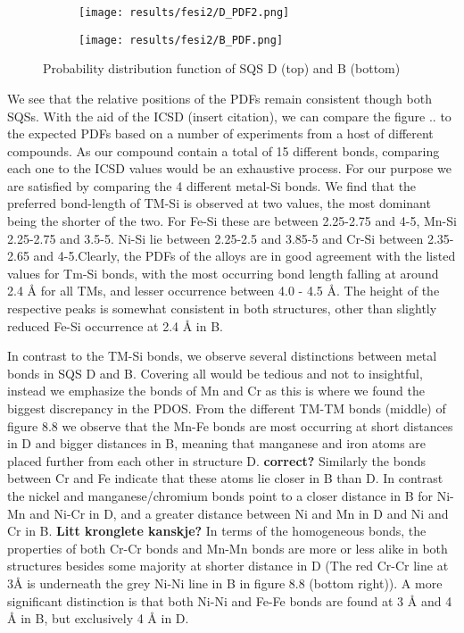 \begin{figure}[H]
	\centering
	\begin{subfigure}{\textwidth}
		\texttt{[image: results/fesi2/D\_PDF2.png]}
	\end{subfigure}
	\begin{subfigure}{\textwidth}
		\texttt{[image: results/fesi2/B\_PDF.png]}
	\end{subfigure}
	\caption{Probability distribution function of SQS D (top) and B (bottom)}
\end{figure}

We see that the relative positions of the PDFs remain consistent though both SQSs. With the aid of the ICSD (insert citation), we can compare the figure .. to the expected PDFs based on a number of experiments from a host of different compounds. As our compound contain a total of 15 different bonds, comparing each one to the ICSD values would be an exhaustive process. For our purpose we are satisfied by comparing the 4 different metal-Si bonds. We find that the preferred bond-length of TM-Si is observed at two values, the most dominant being the shorter of the two. For Fe-Si these are between 2.25-2.75 and 4-5, Mn-Si 2.25-2.75 and 3.5-5. Ni-Si lie between 2.25-2.5 and 3.85-5 and Cr-Si between 2.35-2.65 and 4-5.Clearly, the PDFs of the alloys are in good agreement with the listed values for Tm-Si bonds, with the most occurring bond length falling at around 2.4 Å for all TMs, and lesser occurrence between 4.0 - 4.5 Å. The height of the respective peaks is somewhat consistent in both structures, other than slightly reduced Fe-Si occurrence at 2.4 Å in B.

In contrast to the TM-Si bonds, we observe several distinctions between metal bonds in SQS D and B. Covering all would be tedious and not to insightful, instead we emphasize the bonds of Mn and Cr as this is where we found the biggest discrepancy in the PDOS. From the different TM-TM bonds (middle) of figure 8.8 we observe that the Mn-Fe bonds are most occurring at short distances in D and bigger distances in B, meaning that manganese and iron atoms are placed further from each other in structure D. \textbf{correct?} Similarly the bonds between Cr and Fe   indicate that these atoms lie closer in B than D. In contrast the nickel and manganese/chromium bonds point to a closer distance in B for Ni-Mn and Ni-Cr in D, and a greater distance between Ni and Mn in D and Ni and Cr in B. \textbf{Litt kronglete kanskje?} In terms of the homogeneous bonds, the properties of both Cr-Cr bonds and Mn-Mn bonds are more or less alike in both structures besides some majority at shorter distance in D (The red Cr-Cr line at 3Å is underneath the grey Ni-Ni line in B in figure 8.8 (bottom right)). A more significant distinction is that both Ni-Ni and Fe-Fe bonds are found at 3 Å and 4 Å in B, but exclusively 4 Å in D.    

